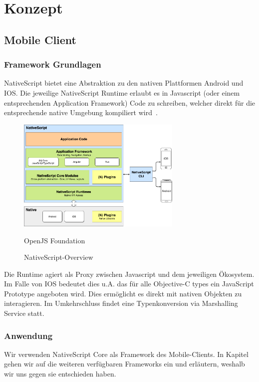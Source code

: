 \section{Konzept}\label{sec:konzept}





\subsection{Mobile Client}\label{subsec:mobile-client}

\subsubsection{Framework Grundlagen}
NativeScript bietet eine Abstraktion zu den nativen Plattformen Android und IOS.
Die jeweilige NativeScript Runtime erlaubt es in Javascript (oder einem entsprechenden Application Framework) Code zu schreiben,
welcher direkt für die entsprechende native Umgebung kompiliert wird~\cite{ns-core-overview}.
\begin{figure}[h]
    \centering
    \label{fig:howNSWorks}
    \includegraphics[width=0.7\textwidth]{graphics/ns-common}\caption[NativeScript-Overview]{NativeScript-Overview}\textcopyright OpenJS Foundation
\end{figure}


Die Runtime agiert als Proxy zwischen Javascript und dem jeweiligen Ökosystem.
Im Falle von IOS bedeutet dies u.A. das für alle Objective-C types ein JavaScript Prototype angeboten wird.
Dies ermöglicht es direkt mit nativen Objekten zu interagieren.
Im Umkehrschluss findet eine Typenkonversion via Marshalling Service statt\cite{ns-ios-runtime}.

\subsubsection{Anwendung}
Wir verwenden NativeScript Core als Framework des Mobile-Clients.
In Kapitel~\emph{} gehen wir auf die weiteren verfügbaren Frameworks ein und erläutern, weshalb wir uns gegen sie entschieden haben.

